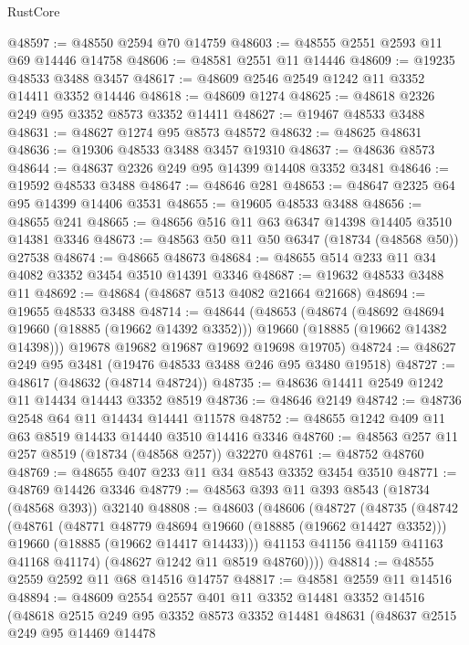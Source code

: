 \begin{lexlean}{RustCore}
\begin{coremodule}
@48597 := @48550 @2594 @70 @14759
@48603 := @48555 @2551 @2593 @11 @69 @14446 @14758
@48606 := @48581 @2551 @11 @14446
@48609 := @19235 @48533 @3488 @3457
@48617 := @48609 @2546 @2549 @1242 @11 @3352 @14411 @3352 @14446
@48618 := @48609 @1274
@48625 := @48618 @2326 @249 @95 @3352 @8573 @3352 @14411
@48627 := @19467 @48533 @3488
@48631 := @48627 @1274 @95 @8573 @48572
@48632 := @48625 @48631
@48636 := @19306 @48533 @3488 @3457 @19310
@48637 := @48636 @8573
@48644 := @48637 @2326 @249 @95 @14399 @14408 @3352 @3481
@48646 := @19592 @48533 @3488
@48647 := @48646 @281
@48653 := @48647 @2325 @64 @95 @14399 @14406 @3531
@48655 := @19605 @48533 @3488
@48656 := @48655 @241
@48665 := @48656 @516 @11 @63 @6347 @14398 @14405 @3510 @14381 @3346
@48673 := @48563 @50 @11 @50 @6347 (@18734 (@48568 @50)) @27538
@48674 := @48665 @48673
@48684 := @48655 @514 @233 @11 @34 @4082 @3352 @3454 @3510 @14391 @3346
@48687 := @19632 @48533 @3488 @11
@48692 := @48684 (@48687 @513 @4082 @21664 @21668)
@48694 := @19655 @48533 @3488
@48714 := @48644
    (@48653
      (@48674
        (@48692 @48694 @19660 (@18885 (@19662 @14392 @3352)))
        @19660
        (@18885 (@19662 @14382 @14398)))
      @19678
      @19682
      @19687
      @19692
      @19698
      @19705)
@48724 := @48627 @249 @95 @3481 (@19476 @48533 @3488 @246 @95 @3480 @19518)
@48727 := @48617 (@48632 (@48714 @48724))
@48735 := @48636 @14411 @2549 @1242 @11 @14434 @14443 @3352 @8519
@48736 := @48646 @2149
@48742 := @48736 @2548 @64 @11 @14434 @14441 @11578
@48752 := @48655 @1242 @409 @11 @63 @8519 @14433 @14440 @3510 @14416 @3346
@48760 := @48563 @257 @11 @257 @8519 (@18734 (@48568 @257)) @32270
@48761 := @48752 @48760
@48769 := @48655 @407 @233 @11 @34 @8543 @3352 @3454 @3510
@48771 := @48769 @14426 @3346
@48779 := @48563 @393 @11 @393 @8543 (@18734 (@48568 @393)) @32140
@48808 := @48603
    (@48606
      (@48727
        (@48735
          (@48742
            (@48761
              (@48771 @48779 @48694 @19660 (@18885 (@19662 @14427 @3352)))
              @19660
              (@18885 (@19662 @14417 @14433)))
            @41153
            @41156
            @41159
            @41163
            @41168
            @41174)
          (@48627 @1242 @11 @8519 @48760))))
@48814 := @48555 @2559 @2592 @11 @68 @14516 @14757
@48817 := @48581 @2559 @11 @14516
@48894 := @48609
    @2554
    @2557
    @401
    @11
    @3352
    @14481
    @3352
    @14516
    (@48618
      @2515
      @249
      @95
      @3352
      @8573
      @3352
      @14481
      @48631
      (@48637
        @2515
        @249
        @95
        @14469
        @14478

\end{coremodule}
\end{lexlean}
